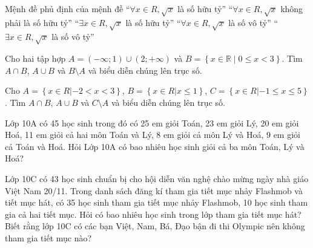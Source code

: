 \begin{ex}
	Mệnh đề phủ định của mệnh đề “$\forall x\in R,\sqrt{x}$ là số hữu tỷ”
	\choice
	{“$\forall x\in R,\sqrt{x}$ không phải là số hữu tỷ”}
	{“$\exists x\in R,\sqrt{x}$ là số hữu tỷ”}
	{“$\forall x\in R,\sqrt{x}$ là số vô tỷ”}
	{“$\exists x\in R,\sqrt{x}$ là số vô tỷ”}
\end{ex}
\begin{ex}
	Cho hai tập hợp $A=\left(-\infty ;1\right)\cup \left(2;+\infty\right)$ và $B=\left\{ x\in \mathbb{R}\mid 0\le x<3 \right\}$. Tìm $A \cap B$, $A\cup B$ và $B\setminus A$ và biểu diễn chúng lên trục số.
\end{ex}
\begin{ex}
	Cho $A=\left\{ x\in R|-2<x<3 \right\}$, $B=\left\{ x\in R|x\le 1 \right\}$, $C=\left\{ x\in R|-1\le x\le 5 \right\}$. Tìm $A \cap B$, $A\cup B$ và $C\setminus A$ và biểu diễn chúng lên trục số.
\end{ex}
\begin{ex}
	Lớp 10A có 45 học sinh trong đó có 25 em giỏi Toán, 23 em giỏi Lý, 20 em giỏi Hoá, 11 em giỏi cả hai môn Toán và Lý, 8 em giỏi cả môn Lý và Hoá, 9 em giỏi cả Toán và Hoá. Hỏi Lớp 10A có bao nhiêu học sinh giỏi cả ba môn Toán, Lý và Hoá?
\end{ex}
\begin{ex}
	Lớp 10C có 43 học sinh chuẩn bị cho hội diễn văn nghệ chào mừng ngày nhà giáo Việt Nam 20/11. Trong danh sách đăng kí tham gia tiết mục nhảy Flashmob và tiết mục hát, có 35 học sinh tham gia tiết mục nhảy Flashmob, 10 học sinh tham gia cả hai tiết mục. Hỏi có bao nhiêu học sinh trong lớp tham gia tiết mục hát? Biết rằng lớp 10C có các bạn Việt, Nam, Bá, Đạo bận đi thi Olympic nên không tham gia tiết mục nào?
\end{ex}
